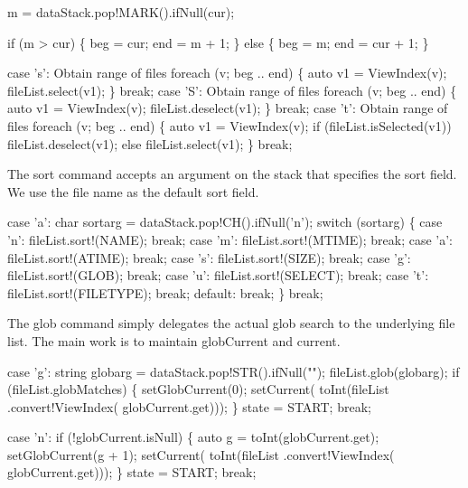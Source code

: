 \nwendcode{}\endmoddef\nwstartdeflinemarkup\nwenddeflinemarkup
m = dataStack.pop!MARK().ifNull(cur);

if (m > cur) \{
  beg = cur;
  end = m + 1;
\} else \{
  beg = m;
  end = cur + 1;
\}

\nwendcode{}\plusendmoddef\nwstartdeflinemarkup\nwenddeflinemarkup
case 's':
  \LA{}Obtain range of files\RA{}
  foreach (v; beg .. end) \{
    auto v1 = ViewIndex(v);
    fileList.select(v1);
  \}
  break;
case 'S':
  \LA{}Obtain range of files\RA{}
  foreach (v; beg .. end) \{
    auto v1 = ViewIndex(v);
    fileList.deselect(v1);
  \}
  break;
case 't':
  \LA{}Obtain range of files\RA{}
  foreach (v; beg .. end) \{
    auto v1 = ViewIndex(v);
    if (fileList.isSelected(v1))
      fileList.deselect(v1);
    else
      fileList.select(v1);
  \}
  break;

\nwendcode{}The sort command accepts an argument on the stack that specifies the
sort field. We use the file name as the default sort field.

\nwenddocs{}\plusendmoddef\nwstartdeflinemarkup\nwenddeflinemarkup
case 'a':
  char sortarg = dataStack.pop!CH().ifNull('n');
  switch (sortarg) \{
    case 'n': fileList.sort!(NAME);     break;
    case 'm': fileList.sort!(MTIME);    break;
    case 'a': fileList.sort!(ATIME);    break;
    case 's': fileList.sort!(SIZE);     break;
    case 'g': fileList.sort!(GLOB);     break;
    case 'u': fileList.sort!(SELECT);   break;
    case 't': fileList.sort!(FILETYPE); break;
    default:  break;
  \}
  break;

\nwendcode{}The glob command simply delegates the actual glob search to the
underlying file list. The main work is to maintain {\Tt{}globCurrent\nwendquote} and
{\Tt{}current\nwendquote}.

\nwenddocs{}\plusendmoddef\nwstartdeflinemarkup\nwenddeflinemarkup
case 'g':
  string globarg = dataStack.pop!STR().ifNull("");
  fileList.glob(globarg);
  if (fileList.globMatches) \{
    setGlobCurrent(0);
    setCurrent(
      toInt(fileList
            .convert!ViewIndex(
              globCurrent.get)));
  \}
  state = START;
  break;

case 'n':
  if (!globCurrent.isNull) \{
    auto g = toInt(globCurrent.get);
    setGlobCurrent(g + 1);
    setCurrent(
      toInt(fileList
            .convert!ViewIndex(
              globCurrent.get)));
  \}
  state = START;
  break;


